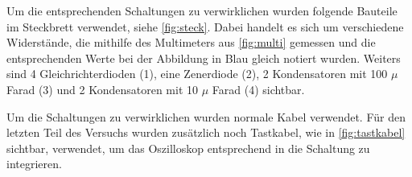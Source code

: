 \documentclass[11pt,ngerman]{scrartcl}
\begin{document}
\begin{minipage}{\textwidth}
\begin{minipage}[t]{0.5\textwidth}
		\label{fig:multi}
	\end{minipage}
	\vspace{1em}
\end{minipage}

Um die entsprechenden Schaltungen zu verwirklichen wurden folgende Bauteile im Steckbrett verwendet, siehe \autoref{fig:steck}. Dabei handelt es sich um verschiedene Widerstände, die mithilfe des Multimeters aus \autoref{fig:multi} gemessen und die entsprechenden Werte bei der Abbildung in Blau gleich notiert wurden. Weiters sind 4 Gleichrichterdioden (1), eine  Zenerdiode (2), 2 Kondensatoren mit 100 $\mu$ Farad (3) und 2 Kondensatoren mit 10 $\mu$ Farad (4) sichtbar.

\vspace{2mm}

Um die Schaltungen zu verwirklichen wurden normale Kabel verwendet. Für den letzten Teil des Versuchs wurden zusätzlich noch Tastkabel, wie in \autoref{fig:tastkabel} sichtbar, verwendet, um das Oszilloskop entsprechend in die Schaltung zu integrieren.

\space{2mm}
\end{document}
